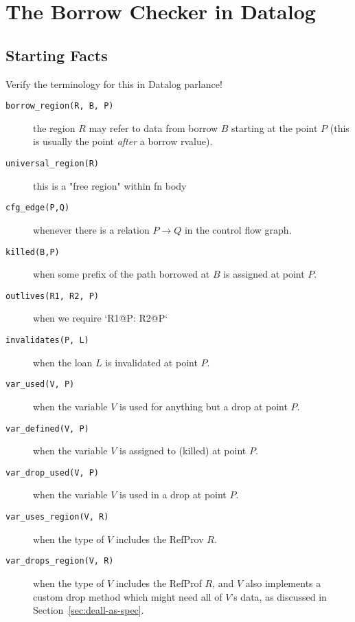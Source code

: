 \documentclass{UUThesisTemplate}
\newcommand{\fixme}[1] {{\color{red}#1}}
\newcommand{\InDatalog}[1]{\texttt{#1}}
\begin{document}
\section{The Borrow Checker in Datalog}


\subsection{Starting Facts}
\label{sec:input-facts}
\fixme{Verify the terminology for this in Datalog parlance!}

\begin{description}
\item[\InDatalog{borrow_region(R, B, P)}] the region $R$ may refer to data from
  borrow $B$ starting at the point $P$ (this is usually the point \emph{after} a
  borrow rvalue).
  
\item[\InDatalog{universal_region(R)}] \fixme{this is a "free region" within fn body}
  
\item[\InDatalog{cfg_edge(P,Q)}] whenever there is a relation $P \rightarrow Q$
  in the control flow graph.
    
\item[\InDatalog{killed(B,P)}] when some prefix of the path borrowed at $B$ is
  assigned at point $P$.
    
\item[\InDatalog{outlives(R1, R2, P)}] \fixme{when we require `R1@P: R2@P`}
    
\item[\InDatalog{invalidates(P, L)}] when the loan $L$ is invalidated at point $P$.
    
\item[\InDatalog{var_used(V, P)}] when the variable $V$ is used for anything but
  a drop at point $P$.
    
\item[\InDatalog{var_defined(V, P)}] when the variable $V$ is assigned to
  (killed) at point $P$.
  
\item[\InDatalog{var_drop_used(V, P)}] when the variable $V$ is used in a drop at point $P$.

\item[\InDatalog{var_uses_region(V, R)}] when the type of $V$ includes the RefProv
  $R$.

\item[\InDatalog{var_drops_region(V, R)}] when the type of $V$ includes the
  RefProf $R$, and $V$ also implements a custom drop method which might need all
  of $V$'s data, as discussed in Section~\ref{sec:deall-as-spec}.
\end{description}
\end{document}
